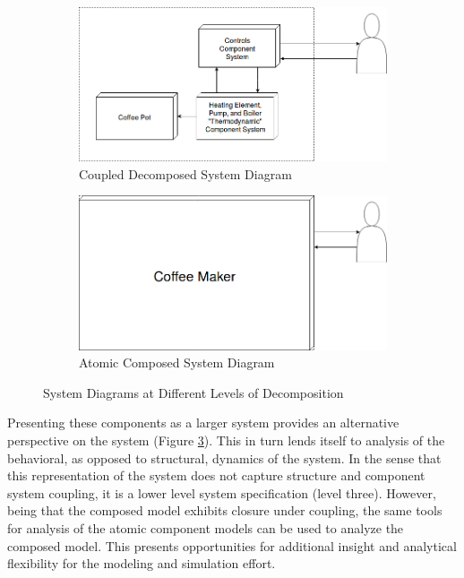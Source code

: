 \documentclass[10pt]{article}
\begin{document}
\begin{center}
  \begin{figure}[H]
    \begin{subfigure}{.5\textwidth}
      \centering
      \includegraphics[width=.8\linewidth]{input/Decomposed_v04}
      \caption{Coupled Decomposed System Diagram}
      \label{fig:sysSpeDia}
    \end{subfigure}%
    \begin{subfigure}{.5\textwidth}
      \centering
      \includegraphics[width=.8\linewidth]{input/Composed_v04}
      \caption{Atomic Composed System Diagram}
      \label{fig:comSysDia}
    \end{subfigure}
  \caption{System Diagrams at Different Levels of Decomposition}
  \end{figure}
\end{center}

Presenting these components as a larger system provides an alternative perspective on the system (Figure \ref{fig:comSysDia}).  This in turn lends itself to analysis of the behavioral, as opposed to structural, dynamics of the system. In the sense that this representation of the system does not capture structure and component system coupling, it is a lower level system specification (level three).  However, being that the composed model exhibits closure under coupling, the same tools for analysis of the atomic component models can be used to analyze the composed model.  This presents opportunities for additional insight and analytical flexibility for the modeling and simulation effort.
\end{document}
